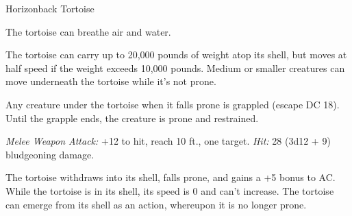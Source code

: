 \documentclass[10pt,a4paper,twoside,bg=none,twocolumn,openany,nodeprecatedcode]{dndbook}
\begin{document}
\begin{DndMonster}[float=t]{Horizonback Tortoise}
\DndMonsterBasics[
armor-class = {17 (natural armor) (22 while in its shell)},
hit-points = {\DndDice{13d20 + 91}},
speed = {20 ft.}
]
\DndMonsterAbilityScores[
 str = 28,
 dex = 3,
 con = 25,
 int = 4,
 wis = 10,
 cha = 5
]
\DndMonsterDetails[
saving-throws = {Str +12, Con +10},
damage-immunities = {poison},
senses = {darkvision 60 ft, passive perception 10},
languages = {understands Goblin but can't speak},
challenge = 8,
]
The tortoise can breathe air and water.

The tortoise can carry up to 20,000 pounds of weight atop its shell, but moves at half speed if the weight exceeds 10,000 pounds. Medium or smaller creatures can move underneath the tortoise while it's not prone.

Any creature under the tortoise when it falls prone is grappled (escape DC 18). Until the grapple ends, the creature is prone and restrained.

\par
{}
\textsl{Melee Weapon Attack:} +12 to hit, reach 10 ft., one target. \textsl{Hit:} 28 (3d12 + 9) bludgeoning damage.

The tortoise withdraws into its shell, falls prone, and gains a +5 bonus to AC. While the tortoise is in its shell, its speed is 0 and can't increase. The tortoise can emerge from its shell as an action, whereupon it is no longer prone.

\end{DndMonster}
\end{document}
